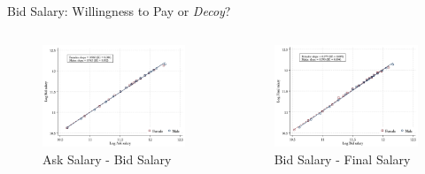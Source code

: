 \begin{frame}{Bid Salary: Willingness to Pay or \textit{Decoy}?}
    \begin{columns}[T]
        \begin{column}{0.45\textwidth}
            \begin{figure}
                \centering
                \includegraphics[width = 0.95 \textwidth]{images/ask3.png}
                {\footnotesize \textcolor{frenchlilac!45!white}{Ask} Salary - \textcolor{frenchlilac!45!white}{Bid} Salary}
            \end{figure}
        \end{column}

        \begin{column}{0.45\textwidth}
            \begin{figure}
                \centering
                \includegraphics[width = 0.95 \textwidth]{images/bid1.png}
                {\footnotesize \textcolor{frenchlilac!45!white}{Bid} Salary - \textcolor{frenchlilac!45!white}{Final} Salary}
            \end{figure}
        \end{column}
    \end{columns}
\end{frame}